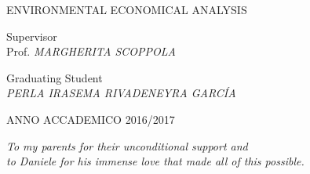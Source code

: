\begin{titlepage}
\begin{center}
\begin{Large}
\vspace*{0.25cm}

ENVIRONMENTAL ECONOMICAL ANALYSIS
\end{Large}

\vspace*{2.75cm}

\begin{minipage}{0.46\textwidth}
\begin{flushleft} 
Supervisor\\
Prof. \textit{MARGHERITA SCOPPOLA}
\end{flushleft}
\end{minipage}
\hfill
\begin{minipage}{0.53\textwidth}
\begin{flushright} 
Graduating Student\\
\textit{PERLA IRASEMA RIVADENEYRA GARC\'{I}A}
\end{flushright}
\end{minipage}

\vspace*{1.5cm}

\begin{large}
ANNO ACCADEMICO 2016/2017
\end{large}

\end{center}
\cleardoublepage
\end{titlepage}

{\pagestyle{empty}

\null{}
\begin{flushright}
\textit{To my parents for their unconditional support and\\ to Daniele for his immense love that made all of this possible.}
\end{flushright}
\null{}

\cleardoublepage}

\frontmatter 

\cleardoublepage
{}
\tableofcontents %

\mainmatter %
